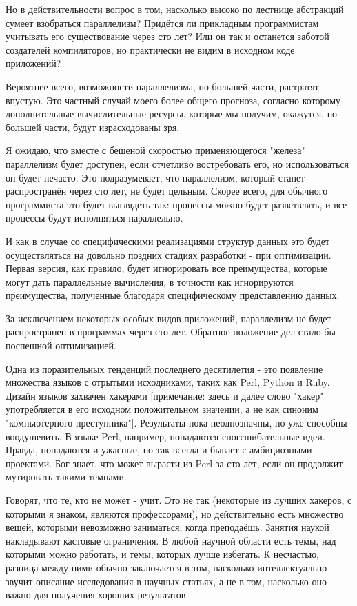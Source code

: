 \documentclass[ebook,12pt,oneside,openany]{memoir}
\begin{document}
Но в действительности вопрос в том, насколько высоко по лестнице
абстракций сумеет взобраться параллелизм? Придётся ли прикладным
программистам учитывать его существование через сто лет? Или он так и
останется заботой создателей компиляторов, но практически не видим в
исходном коде приложений?

Вероятнее всего, возможности параллелизма, по большей части, растратят
впустую. Это частный случай моего более общего прогноза, согласно
которому дополнительные вычислительные ресурсы, которые мы получим,
окажутся, по большей части, будут израсходованы зря.

Я ожидаю, что вместе с бешеной скоростью применяющегося "железа"
параллелизм будет доступен, если отчетливо востребовать его, но
использоваться он будет нечасто. Это подразумевает, что параллелизм,
который станет распространён через сто лет, не будет цельным. Скорее
всего, для обычного программиста это будет выглядеть так: процессы
можно будет разветвлять, и все процессы будут исполняться параллельно.

И как в случае со специфическими реализациями структур данных это
будет осуществляться на довольно поздних стадиях разработки - при
оптимизации. Первая версия, как правило, будет игнорировать все
преимущества, которые могут дать параллельные вычисления, в точности
как игнорируются преимущества, полученные благодаря специфическому
представлению данных.

За исключением некоторых особых видов приложений, параллелизм не будет
распространен в программах через сто лет. Обратное положение дел стало
бы поспешной оптимизацией.

Одна из поразительных тенденций последнего десятилетия - это появление
множества языков с отрытыми исходниками, таких как Perl, Python и
Ruby. Дизайн языков захвачен хакерами [примечание: здесь и далее слово
"хакер" употребляется в его исходном положительном значении, а не как
синоним "компьютерного преступника"]. Результаты пока неоднозначны, но
уже способны воодушевить. В языке Perl, например, попадаются
сногсшибательные идеи. Правда, попадаются и ужасные, но так всегда и
бывает с амбициозными проектами. Бог знает, что может вырасти из Perl
за сто лет, если он продолжит мутировать такими темпами.

Говорят, что те, кто не может - учит. Это не так (некоторые из лучших
хакеров, с которыми я знаком, являются профессорами), но действительно
есть множество вещей, которыми невозможно заниматься, когда
преподаёшь. Занятия наукой накладывают кастовые ограничения. В любой
научной области есть темы, над которыми можно работать, и темы,
которых лучше избегать. К несчастью, разница между ними обычно
заключается в том, насколько интеллектуально звучит описание
исследования в научных статьях, а не в том, насколько оно важно для
получения хороших результатов.
\end{document}
